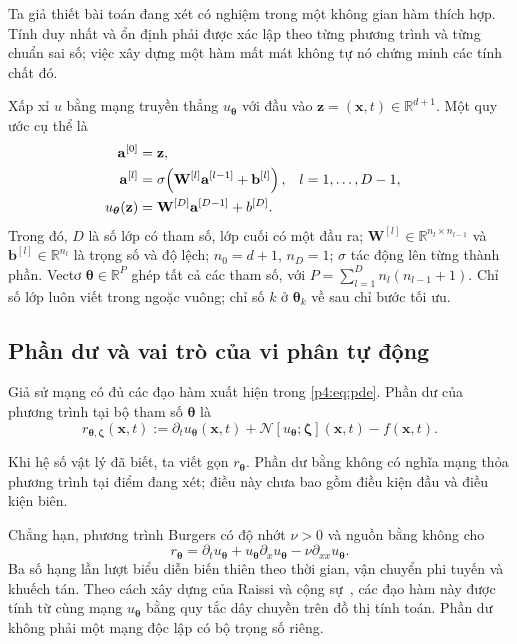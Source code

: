 Ta giả thiết bài toán đang xét có nghiệm trong một không gian hàm thích
hợp. Tính duy nhất và ổn định phải được xác lập theo từng phương trình
và từng chuẩn sai số; việc xây dựng một hàm mất mát không tự nó chứng minh
các tính chất đó.

Xấp xỉ $u$ bằng mạng truyền thẳng $u_{\boldsymbol{\theta}}$ với đầu vào
$\mathbf{z}=(\mathbf{x},t)\in\mathbb{R}^{d+1}$. Một quy ước cụ thể là
\begin{align}
 \mathbf{a}^{[0]}&=\mathbf{z},\notag\\
 \mathbf{a}^{[l]}&=\sigma\!\left(\mathbf{W}^{[l]}\mathbf{a}^{[l-1]}
                                     +\mathbf{b}^{[l]}\right),
                       &&l=1,\ldots,D-1,\notag\\
 u_{\boldsymbol{\theta}}(\mathbf{z})
 &=\mathbf{W}^{[D]}\mathbf{a}^{[D-1]}+b^{[D]}.
 \label{p4:eq:network}
\end{align}
Trong đó, $D$ là số lớp có tham số, lớp cuối có một đầu ra;
$\mathbf{W}^{[l]}\in\mathbb{R}^{n_l\times n_{l-1}}$ và
$\mathbf{b}^{[l]}\in\mathbb{R}^{n_l}$ là trọng số và độ lệch;
$n_0=d+1$, $n_D=1$; $\sigma$ tác động lên từng thành phần.
Vectơ $\boldsymbol{\theta}\in\mathbb{R}^{P}$ ghép tất cả các tham số,
với $P=\sum_{l=1}^{D}n_l(n_{l-1}+1)$. Chỉ số lớp luôn viết trong ngoặc
vuông; chỉ số $k$ ở $\boldsymbol{\theta}_k$ về sau chỉ bước tối ưu.

\subsection{Phần dư và vai trò của vi phân tự động}

\begin{definition}
Giả sử mạng có đủ các đạo hàm xuất hiện trong \eqref{p4:eq:pde}.
Phần dư của phương trình tại bộ tham số $\boldsymbol{\theta}$ là
\begin{equation}
 r_{\boldsymbol{\theta},\boldsymbol{\zeta}}(\mathbf{x},t)
 :=\partial_tu_{\boldsymbol{\theta}}(\mathbf{x},t)
 +\mathcal{N}[u_{\boldsymbol{\theta}};\boldsymbol{\zeta}](\mathbf{x},t)
 -f(\mathbf{x},t).
 \label{p4:eq:residual}
\end{equation}
\end{definition}
Khi hệ số vật lý đã biết, ta viết gọn $r_{\boldsymbol{\theta}}$.
Phần dư bằng không có nghĩa mạng thỏa phương trình tại điểm đang xét;
điều này chưa bao gồm điều kiện đầu và điều kiện biên.

Chẳng hạn, phương trình Burgers có độ nhớt $\nu>0$ và nguồn bằng không
cho
\begin{equation}
 r_{\boldsymbol{\theta}}
 =\partial_tu_{\boldsymbol{\theta}}
 +u_{\boldsymbol{\theta}}\partial_xu_{\boldsymbol{\theta}}
 -\nu\partial_{xx}u_{\boldsymbol{\theta}}.
 \label{p4:eq:burgers-residual}
\end{equation}
Ba số hạng lần lượt biểu diễn biến thiên theo thời gian, vận chuyển phi
tuyến và khuếch tán. Theo cách xây dựng của Raissi và cộng
sự~\cite{raissi2019,raissi2017a}, các đạo hàm này được tính từ cùng mạng
$u_{\boldsymbol{\theta}}$ bằng quy tắc dây chuyền trên đồ thị tính toán.
Phần dư không phải một mạng độc lập có bộ trọng số riêng.

